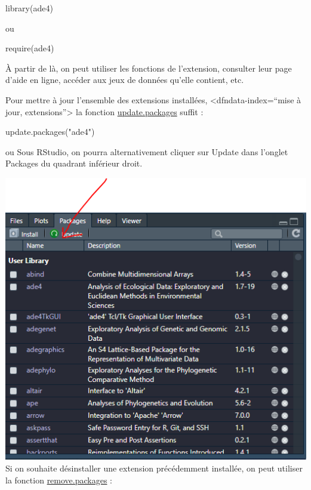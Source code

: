 \documentclass[
]{book}
\newenvironment{Shaded}{\begin{snugshade}}{\end{snugshade}}
\newcommand{\FunctionTok}[1]{\textcolor[rgb]{0.00,0.00,0.00}{#1}}
\newcommand{\NormalTok}[1]{#1}
\newcommand{\StringTok}[1]{\textcolor[rgb]{0.31,0.60,0.02}{#1}}
\begin{document}
\begin{Shaded}
\begin{Highlighting}[]
\FunctionTok{library}\NormalTok{(ade4)}
\end{Highlighting}
\end{Shaded}

ou

\begin{Shaded}
\begin{Highlighting}[]
\FunctionTok{require}\NormalTok{(ade4)}
\end{Highlighting}
\end{Shaded}

À partir de là, on peut utiliser les fonctions de l'extension, consulter leur page d'aide en ligne, accéder aux jeux de données qu'elle contient, etc.

Pour mettre à jour l'ensemble des extensions installées, \textless dfndata-index=``mise à jour, extensions''\textgreater{} la fonction \href{http://rdrr.io/pkg/utils/sym/update.packages}{update.packages} suffit :

\begin{Shaded}
\begin{Highlighting}[]
\FunctionTok{update.packages}\NormalTok{(}\StringTok{"ade4"}\NormalTok{)}
\end{Highlighting}
\end{Shaded}

ou
Sous RStudio, on pourra alternativement cliquer sur Update dans l'onglet Packages du quadrant inférieur droit.

\includegraphics[width=0.75\linewidth]{images/packages2}
Si on souhaite désinstaller une extension précédemment installée, on peut utiliser la fonction \href{http://rdrr.io/pkg/utils/sym/remove.packages}{remove.packages} :
\end{document}
